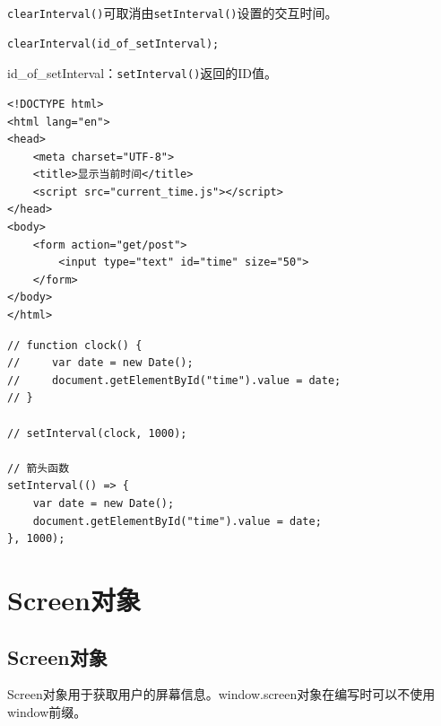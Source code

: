 \lstinline|clearInterval()|可取消由\lstinline|setInterval()|设置的交互时间。 \\

\begin{lstlisting}[style=htmlcssjs]
clearInterval(id_of_setInterval);
\end{lstlisting}

id\_of\_setInterval：\lstinline|setInterval()|返回的ID值。 \\


\begin{lstlisting}[style=htmlcssjs, title=current\_time.html]
<!DOCTYPE html>
<html lang="en">
<head>
    <meta charset="UTF-8">
    <title>显示当前时间</title>
    <script src="current_time.js"></script>
</head>
<body>
    <form action="get/post">
        <input type="text" id="time" size="50">
    </form>
</body>
</html>
\end{lstlisting}

\begin{lstlisting}[style=htmlcssjs, title=current\_time.js]
// function clock() {
//     var date = new Date();
//     document.getElementById("time").value = date;
// }

// setInterval(clock, 1000);

// 箭头函数
setInterval(() => {
    var date = new Date();
    document.getElementById("time").value = date;
}, 1000);
\end{lstlisting}

\newpage

\section{Screen对象}

\subsection{Screen对象}

Screen对象用于获取用户的屏幕信息。window.screen对象在编写时可以不使用window前缀。

\begin{table}[H]
	\centering
	\caption{Screen属性}
\end{table}

